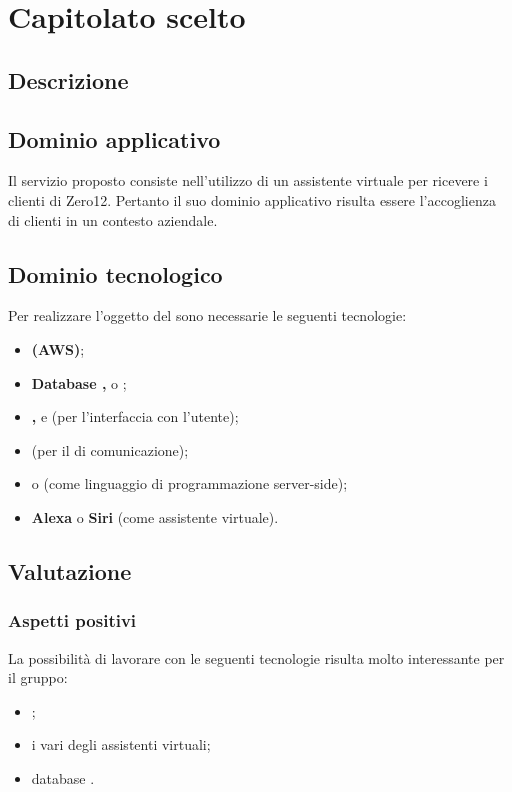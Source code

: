\section {Capitolato scelto}
	\subsection {Descrizione}
		\SCOPO
	\subsection {Dominio applicativo}
Il servizio proposto consiste nell'utilizzo di un assistente virtuale per ricevere i clienti di Zero12. Pertanto il suo dominio applicativo risulta essere l'accoglienza di clienti in un contesto aziendale.
	\subsection {Dominio tecnologico}
		Per realizzare l'oggetto del  sono necessarie le seguenti tecnologie:
		\begin {itemize}
			\item \textbf{ (AWS)};
			\item \textbf{Database , } o \textbf{};
			\item \textbf{, } e \textbf{} (per l'interfaccia con l'utente);
			\item \textbf{} (per il  di comunicazione);
			\item \textbf{} o \textbf{} (come linguaggio di programmazione
 server-side);
 			\item \textbf{ Alexa} o \textbf{Siri} (come assistente virtuale).

		\end {itemize}
	\subsection {Valutazione}
		\subsubsection {Aspetti positivi}
			 La possibilità di lavorare con le seguenti tecnologie risulta molto interessante per il gruppo:
				 \begin {itemize}
				 	\item {};
				 	\item i vari  degli assistenti virtuali;
				 	\item database .
				 \end {itemize}
